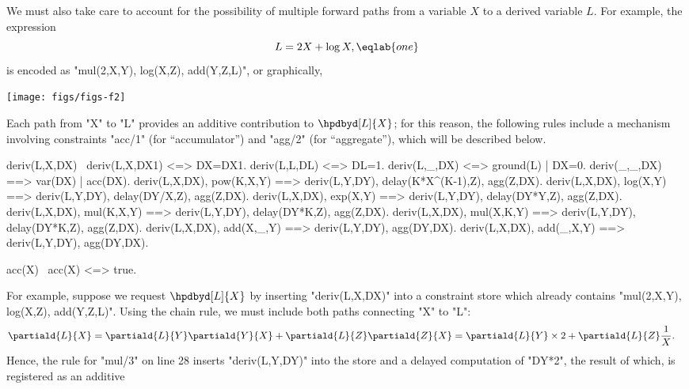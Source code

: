 We must also take care to account for the possibility of multiple forward
paths from a variable $X$ to a derived variable $L$. For example, 
the expression
\begin{equation}
	L = 2X + \log X,
	\eqlab{one}
\end{equation}
is encoded as "mul(2,X,Y), log(X,Z), add(Y,Z,L)", or graphically,
\begin{center}
\texttt{[image: figs/figs-f2]}
\end{center}
Each path from "X" to "L" provides an
additive contribution to $\hpdbyd[L]{X}$; for this reason, the following
rules include a mechanism involving constraints "acc/1" (for ``accumulator'')
and "agg/2" (for ``aggregate''), which will be described below.
\begin{prolog-framed}[numbers=left,name=adone,firstnumber=21]
	deriv(L,X,DX) \ deriv(L,X,DX1) <=> DX=DX1.
	deriv(L,L,DL) <=> DL=1.
	deriv(L,_,DX) <=> ground(L) | DX=0.
	deriv(_,_,DX) ==> var(DX) | acc(DX).
	deriv(L,X,DX), pow(K,X,Y) ==> deriv(L,Y,DY), delay(K*X^(K-1),Z), agg(Z,DX).
	deriv(L,X,DX), log(X,Y)   ==> deriv(L,Y,DY), delay(DY/X,Z), agg(Z,DX).
	deriv(L,X,DX), exp(X,Y)   ==> deriv(L,Y,DY), delay(DY*Y,Z), agg(Z,DX).
	deriv(L,X,DX), mul(K,X,Y) ==> deriv(L,Y,DY), delay(DY*K,Z), agg(Z,DX).
	deriv(L,X,DX), mul(X,K,Y) ==> deriv(L,Y,DY), delay(DY*K,Z), agg(Z,DX).
	deriv(L,X,DX), add(X,_,Y) ==> deriv(L,Y,DY),                agg(DY,DX).
	deriv(L,X,DX), add(_,X,Y) ==> deriv(L,Y,DY),                agg(DY,DX).

	acc(X) \ acc(X) <=> true.
\end{prolog-framed}
For example, suppose we request $\hpdbyd[L]{X}$ by inserting "deriv(L,X,DX)"
into a constraint store which already 
contains "mul(2,X,Y), log(X,Z), add(Y,Z,L)".
Using the chain rule, we must include both paths connecting "X" to "L":
\begin{align*}
	\partiald{L}{X} &= \partiald{L}{Y} \partiald{Y}{X} + \partiald{L}{Z} \partiald{Z}{X} 
	= \partiald{L}{Y}\times 2 + \partiald{L}{Z} \frac{1}{X} .
\end{align*}
Hence, the rule for "mul/3" on line 28 inserts "deriv(L,Y,DY)" into the store and
a delayed computation of "DY*2", the result of which, is registered as an additive
